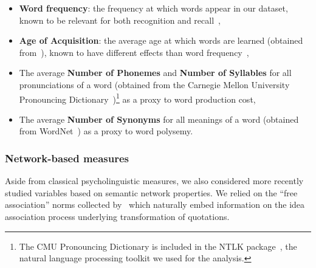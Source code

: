 \begin{itemize}
    \item \textbf{Word frequency}: the frequency at which words appear in our dataset, known to be relevant for both recognition and recall~\citep{gregg1976word},
    \item \textbf{Age of Acquisition}: the average age at which words are learned (obtained from~\citet{Kuperman12}), known to have different effects than word frequency~\citep{morrison1995roles,dewhurst1998separate},
    \item The average \textbf{Number of Phonemes} and \textbf{Number of Syllables} for all pronunciations of a word (obtained from the Carnegie Mellon University Pronouncing Dictionary~\citep{Weide98})\footnote{The CMU Pronouncing Dictionary is included in the NTLK package~\citep{Bird09}, the natural language processing toolkit we used for the analysis.} as a proxy to word production cost,
    \item The average \textbf{Number of Synonyms} for all meanings of a word (obtained from WordNet~\citep{WordNet10}) as a proxy to word polysemy.
\end{itemize}


\subsubsection{Network-based measures}

Aside from classical psycholinguistic measures, we also considered more recently studied variables based on semantic network properties.
We relied on the ``free association'' norms collected by~\citet{Nelson04} which naturally embed information on the idea association process underlying transformation of quotations.

